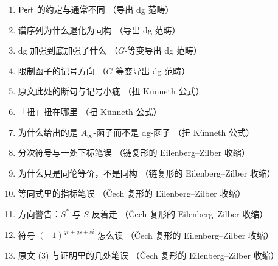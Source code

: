 \begin{enumerate}[label={译注 \arabic*：},leftmargin=2.8cm,itemsep=1pt]
\item $\operatorname{\mathsf{Perf}}$ 的约定与通常不同 \quad（导出 dg 范畴）
\item 谱序列为什么退化为同构 \quad（导出 dg 范畴）
\item dg 加强到底加强了什么 \quad（$G$-等变导出 dg 范畴）
\item 限制函子的记号方向 \quad（$G$-等变导出 dg 范畴）
\item 原文此处的断句与记号小疵 \quad（扭 Künneth 公式）
\item 「扭」扭在哪里 \quad（扭 Künneth 公式）
\item 为什么给出的是 $A_{\infty}$-函子而不是 dg-函子 \quad（扭 Künneth 公式）
\item 分次符号与一处下标笔误 \quad（链复形的 Eilenberg--Zilber 收缩）
\item 为什么只是同伦等价，不是同构 \quad（链复形的 Eilenberg--Zilber 收缩）
\item 等同式里的指标笔误 \quad（\v{C}ech 复形的 Eilenberg--Zilber 收缩）
\item 方向警告：$S^*$ 与 $S$ 反着走 \quad（\v{C}ech 复形的 Eilenberg--Zilber 收缩）
\item 符号 $(-1)^{qr+qs+si}$ 怎么读 \quad（\v{C}ech 复形的 Eilenberg--Zilber 收缩）
\item 原文 (3) 与证明里的几处笔误 \quad（\v{C}ech 复形的 Eilenberg--Zilber 收缩）
\end{enumerate}

